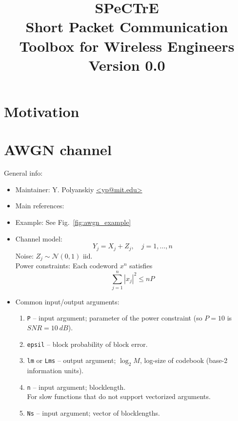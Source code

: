 \documentclass[a4paper,11p]{memoir}
\def\matn{\mathcal{N}}
\begin{document}
\title{SPeCTrE\\
Short Packet Communication Toolbox for Wireless Engineers\\[1cm]
Version 0.0}

\maketitle

\begin{abstract}
  
\end{abstract}
\newpage
\tableofcontents

\newpage
\chapter{Motivation}



\chapter{AWGN channel}


General info:
\begin{itemize}
\item Maintainer: Y. Polyanskiy \url{<yp@mit.edu>}

\item Main references: \cite{PPV08,PPV10eneff}

\item Example: See Fig.~\ref{fig:awgn_example} 

\item Channel model:
	$$ Y_j = X_j + Z_j, \quad j=1,\ldots,n $$
	Noise: $Z_j \sim \matn(0,1)$ iid.\\
	Power constraints: Each codeword $x^n$ satisfies
			$$ \sum_{j=1}^n |x_j|^2 \le n P $$

\item Common input/output arguments:
\begin{enumerate}
\item \verb|P| -- input argument; parameter of the power constraint (so $P=10$ is $SNR=10~dB$).
\item \verb|epsil| -- block probability of block error.
\item \verb|lm| or \verb|Lms| -- output argument; $\log_2 M$, log-size of codebook (base-2 information units). 
\item \verb|n| -- input argument; blocklength.\\
		For slow functions that do not support vectorized arguments.
\item \verb|Ns| -- input argument; vector of blocklengths.
\end{enumerate}
\end{itemize}
\end{document}
